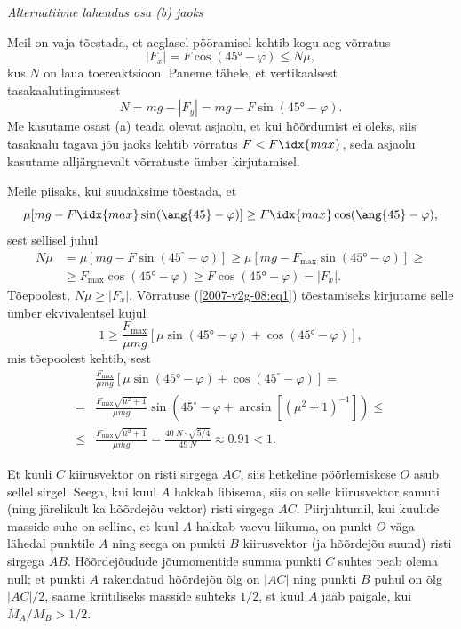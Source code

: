 \documentclass[10pt, twoside]{article}
\begin{document}
{\vspace{0.5\baselineskip}

\emph{Alternatiivne lahendus osa (b) jaoks} 

Meil on vaja tõestada, et aeglasel pööramisel kehtib kogu aeg võrratus
\[
\left|F_{x}\right|=F \cos \left(\ang{45}-\varphi\right) \leq N \mu,
\]
kus $N$ on laua toereaktsioon. Paneme tähele, et vertikaalsest tasakaalutingimusest
\[
N=m g-\left|F_{y}\right|=m g-F \sin \left(\ang{45}-\varphi\right).
\]
Me kasutame osast (a) teada olevat asjaolu, et kui hõõrdumist ei oleks, siis tasakaalu tagava jõu jaoks kehtib võrratus $F < F\idx{max}$, seda asjaolu kasutame alljärgnevalt võrratuste ümber kirjutamisel.

Meile piisaks, kui suudaksime tõestada, et
\begin{equation}\label{2007-v2g-08:eq1}
\mu [mg - F\idx{max} \sin (\ang{45} - \varphi )] \geq F\idx{max} \cos (\ang{45} - \varphi ),
\end{equation}
sest sellisel juhul
\[
\begin{aligned}
N \mu &=\mu\left[m g-F \sin \left(45^{\circ}-\varphi\right)\right] \geq \mu\left[m g-F_{\max } \sin \left(\ang{45}-\varphi\right)\right] \geq \\ & \geq F_{\max } \cos \left(\ang{45}-\varphi\right) \geq F \cos \left(\ang{45}-\varphi\right)=\left|F_{x}\right|.
\end{aligned}
\]
Tõepoolest, $N\mu \geq |F_x|$. Võrratuse (\ref{2007-v2g-08:eq1}) tõestamiseks kirjutame selle ümber ekvivalentsel kujul
\[
1 \geq \frac{F_{\max }}{\mu m g}\left[\mu \sin \left(\ang{45}-\varphi\right)+\cos \left(\ang{45}-\varphi\right)\right],
\]
mis tõepoolest kehtib, sest
\[
\begin{aligned} 
& \frac{F_{\max }}{\mu m g}\left[\mu \sin \left(\ang{45}-\varphi\right)+\cos \left(45^{\circ}-\varphi\right)\right]=\\=& \frac{F_{\max } \sqrt{\mu^{2}+1}}{\mu m g} \sin \left(45^{\circ}-\varphi+\arcsin \left[\left(\mu^{2}+1\right)^{-1}\right]\right) \leq \\ \leq & \frac{F_{\max } \sqrt{\mu^{2}+1}}{\mu m g}=\frac{\SI{40}{N} \cdot \sqrt{5 / 4}}{\SI{49}{N}} \approx \num{0,91}<1. 
\end{aligned}
\]
\probend
\bigskip


\solu
Et kuuli $C$ kiirusvektor on risti sirgega $AC$, siis hetkeline pöörlemiskese $O$ asub sellel sirgel. Seega, kui kuul $A$ hakkab libisema, siis on selle kiirusvektor samuti (ning järelikult ka hõõrdejõu vektor) risti sirgega $AC$. Piirjuhtumil, kui kuulide masside suhe on selline, et kuul $A$ hakkab vaevu liikuma, on punkt $O$ väga lähedal punktile $A$ ning seega on punkti $B$ kiirusvektor (ja hõõrdejõu suund) risti sirgega $AB$. Hõõrdejõudude jõumomentide summa punkti $C$ suhtes peab olema null; et punkti $A$ rakendatud hõõrdejõu õlg on $|AC|$ ning punkti $B$ puhul on õlg $|AC|/2$, saame kriitiliseks masside suhteks $1/2$, st kuul $A$ jääb paigale, kui $M_A/M_B > 1/2$.

}
\end{document}

